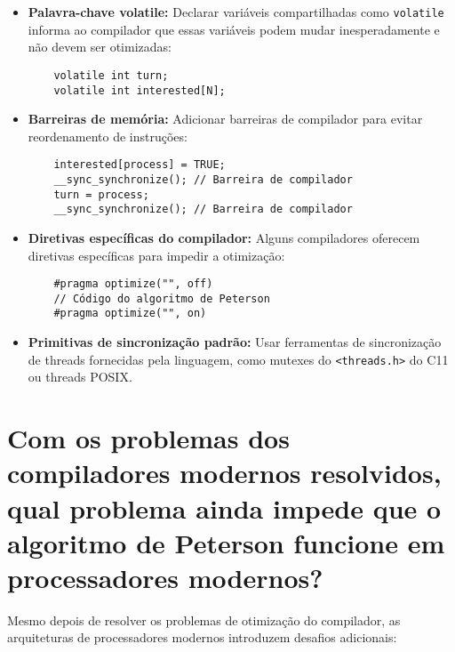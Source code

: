 \documentclass[12pt]{article}
\begin{document}
\begin{itemize}
    \item \textbf{Palavra-chave volatile:} Declarar variáveis compartilhadas como \texttt{volatile} informa ao compilador que essas variáveis podem mudar inesperadamente e não devem ser otimizadas:

    \begin{lstlisting}
    volatile int turn;
    volatile int interested[N];
    \end{lstlisting}

    \item \textbf{Barreiras de memória:} Adicionar barreiras de compilador para evitar reordenamento de instruções:

    \begin{lstlisting}
    interested[process] = TRUE;
    __sync_synchronize(); // Barreira de compilador
    turn = process;
    __sync_synchronize(); // Barreira de compilador
    \end{lstlisting}

    \item \textbf{Diretivas específicas do compilador:} Alguns compiladores oferecem diretivas específicas para impedir a otimização:

    \begin{lstlisting}
    #pragma optimize("", off)
    // Código do algoritmo de Peterson
    #pragma optimize("", on)
    \end{lstlisting}

    \item \textbf{Primitivas de sincronização padrão:} Usar ferramentas de sincronização de threads fornecidas pela linguagem, como mutexes do \texttt{<threads.h>} do C11 ou threads POSIX.
\end{itemize}

\section{Com os problemas dos compiladores modernos resolvidos, qual problema ainda impede que o algoritmo de Peterson funcione em processadores modernos?}

Mesmo depois de resolver os problemas de otimização do compilador, as arquiteturas de processadores modernos introduzem desafios adicionais:
\end{document}
